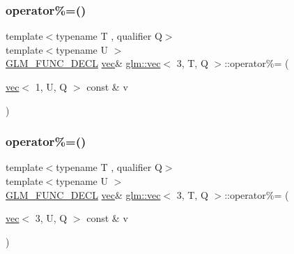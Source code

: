 \mbox{\label{structglm_1_1vec_3_013_00_01_t_00_01_q_01_4_a6be535e570c0bf961ffe15426bdca592}} 
\subsubsection{\texorpdfstring{operator\%=()}{operator\%=()}\hspace{0.1cm}{\footnotesize\ttfamily [2/6]}}
{\footnotesize\ttfamily template$<$typename T , qualifier Q$>$ \\
template$<$typename U $>$ \\
\mbox{\hyperlink{setup_8hpp_ab2d052de21a70539923e9bcbf6e83a51}{G\+L\+M\+\_\+\+F\+U\+N\+C\+\_\+\+D\+E\+CL}} \mbox{\hyperlink{structglm_1_1vec}{vec}}\& \mbox{\hyperlink{structglm_1_1vec}{glm\+::vec}}$<$ 3, T, Q $>$\+::operator\%= (\begin{DoxyParamCaption}\item[{\mbox{\hyperlink{structglm_1_1vec}{vec}}$<$ 1, U, Q $>$ const \&}]{v }\end{DoxyParamCaption})}

\mbox{\label{structglm_1_1vec_3_013_00_01_t_00_01_q_01_4_a60aee54fdff3fb07eb2a58f95c9690c5}} 
\subsubsection{\texorpdfstring{operator\%=()}{operator\%=()}\hspace{0.1cm}{\footnotesize\ttfamily [3/6]}}
{\footnotesize\ttfamily template$<$typename T , qualifier Q$>$ \\
template$<$typename U $>$ \\
\mbox{\hyperlink{setup_8hpp_ab2d052de21a70539923e9bcbf6e83a51}{G\+L\+M\+\_\+\+F\+U\+N\+C\+\_\+\+D\+E\+CL}} \mbox{\hyperlink{structglm_1_1vec}{vec}}\& \mbox{\hyperlink{structglm_1_1vec}{glm\+::vec}}$<$ 3, T, Q $>$\+::operator\%= (\begin{DoxyParamCaption}\item[{\mbox{\hyperlink{structglm_1_1vec}{vec}}$<$ 3, U, Q $>$ const \&}]{v }\end{DoxyParamCaption})}

